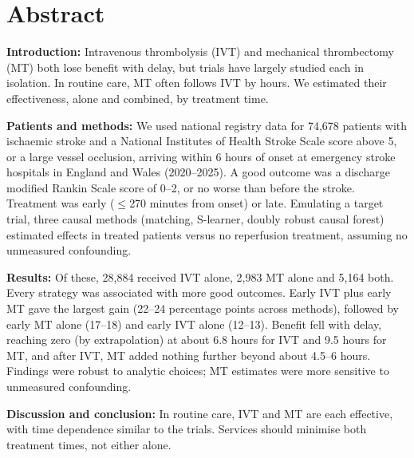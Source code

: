 
\section*{Abstract}

\ifshortabstract

\textbf{Introduction:} Intravenous thrombolysis (IVT) and mechanical thrombectomy (MT) both lose benefit with delay, but trials have largely studied each in isolation. In routine care, MT often follows IVT by hours. We estimated their effectiveness, alone and combined, by treatment time.

\textbf{Patients and methods:} We used national registry data for 74,678 patients with ischaemic stroke and a National Institutes of Health Stroke Scale score above 5, or a large vessel occlusion, arriving within 6 hours of onset at emergency stroke hospitals in England and Wales (2020--2025). A good outcome was a discharge modified Rankin Scale score of 0--2, or no worse than before the stroke. Treatment was early ($\leq$270 minutes from onset) or late. Emulating a target trial, three causal methods (matching, S-learner, doubly robust causal forest) estimated effects in treated patients versus no reperfusion treatment, assuming no unmeasured confounding.

\textbf{Results:} Of these, 28,884 received IVT alone, 2,983 MT alone and 5,164 both. Every strategy was associated with more good outcomes. Early IVT plus early MT gave the largest gain (22--24 percentage points across methods), followed by early MT alone (17--18) and early IVT alone (12--13). Benefit fell with delay, reaching zero (by extrapolation) at about 6.8 hours for IVT and 9.5 hours for MT, and after IVT, MT added nothing further beyond about 4.5--6 hours. Findings were robust to analytic choices; MT estimates were more sensitive to unmeasured confounding.

\textbf{Discussion and conclusion:} In routine care, IVT and MT are each effective, with time dependence similar to the trials. Services should minimise both treatment times, not either alone.

